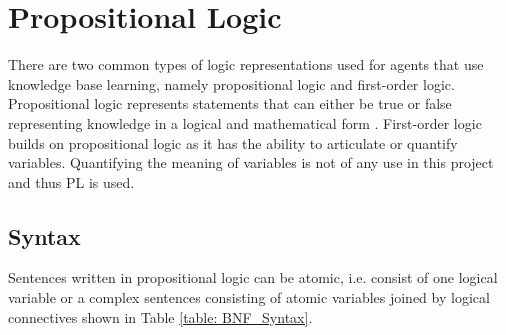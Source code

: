 \section{Propositional Logic}



There are two common types of logic representations used for agents that use knowledge base learning, namely propositional logic and first-order logic. Propositional logic  represents statements that can either be true or false representing knowledge in a logical and mathematical form \cite{Logic}. First-order logic builds on propositional logic as it has the ability to articulate or quantify variables. Quantifying the meaning of variables is not of any use in this project and thus PL is used.


\subsection{Syntax}




Sentences written in propositional logic can be atomic, i.e. consist of one logical variable or a complex sentences consisting of atomic variables joined by logical connectives shown in Table \ref{table: BNF_Syntax}.

